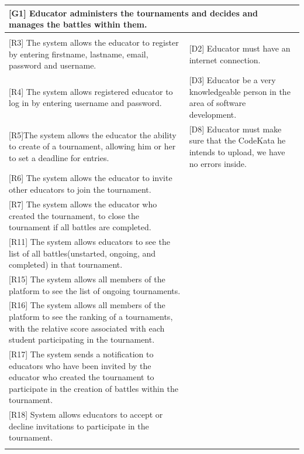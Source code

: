 \begin{tabular}{|p{7.5cm}|p{7.5cm}|}
\hline
\multicolumn{2}{|p{15cm}|}{\textbf{[G1] Educator administers the tournaments and decides and manages the battles within them.}}\\

\hline
\vspace{2pt}&\vspace{2pt}\\
{[R3] The system allows the educator to register by entering firstname, lastname, email, password and username.}
&
{[D2] Educator must have an internet connection.}
\\

{[R4] The system allows registered educator to log in by entering username and password.}
&
{[D3] Educator be a very knowledgeable person in the area of software development.}
\\

{[R5]}The system allows the educator the ability to create of a tournament, allowing him or her to set a deadline for entries.
&
{[D8] Educator must make sure that the CodeKata he intends to upload, we have no errors inside.}
\\

{[R6] The system allows the educator to invite other educators to join the tournament.}
&
\\

{[R7] The system allows the educator who created the tournament, to close the tournament if all battles are completed.}
&
\\

{[R11] The system allows educators to see the list of all battles(unstarted, ongoing, and completed) in that tournament.}
& \\

{[R15] The system allows all members of the platform to see the list of ongoing tournaments.}
& \\

{[R16] The system allows all members of the platform to see the ranking of a tournaments, with the relative score associated with each student participating in the tournament.}
& \\

{[R17] The system sends a notification to educators who have been invited by the educator who created the tournament to participate in the creation of battles within the tournament.}
& \\

{[R18] System allows educators to accept or decline invitations to participate in the tournament.}
& \\
\vspace{2pt}&\vspace{2pt}\\
\hline
\end{tabular}
